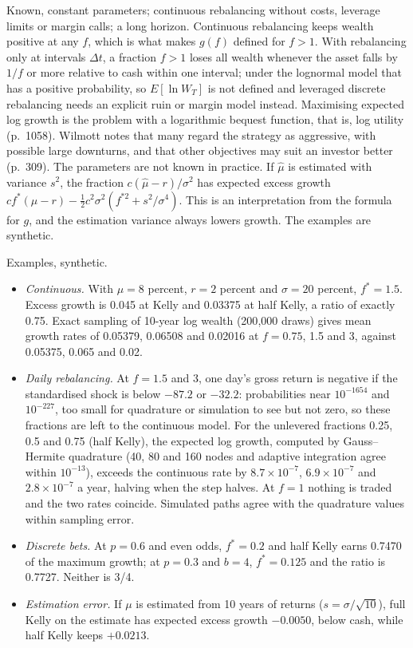\begin{qfresult}
 Known, constant parameters; continuous rebalancing without costs, leverage limits or margin calls; a long horizon. Continuous rebalancing keeps wealth positive at any $f$, which is what makes $g(f)$ defined for $f>1$. With rebalancing only at intervals $\Delta t$, a fraction $f>1$ loses all wealth whenever the asset falls by $1/f$ or more relative to cash within one interval; under the lognormal model that has a positive probability, so $E[\ln W_T]$ is not defined and leveraged discrete rebalancing needs an explicit ruin or margin model instead. Maximising expected log growth is the problem with a logarithmic bequest function, that is, log utility (p.~1058). Wilmott notes that many regard the strategy as aggressive, with possible large downturns, and that other objectives may suit an investor better (p.~309). The parameters are not known in practice. If $\hat\mu$ is estimated with variance $s^2$, the fraction $c(\hat\mu-r)/\sigma^2$ has expected excess growth $cf^*(\mu-r)-\tfrac12c^2\sigma^2(f^{*2}+s^2/\sigma^4)$. This is an interpretation from the formula for $g$, and the estimation variance always lowers growth. The examples are synthetic.

 Examples, synthetic.
\begin{itemize}
\item \emph{Continuous.} With $\mu=8$ percent, $r=2$ percent and $\sigma=20$ percent, $f^*=1.5$. Excess growth is 0.045 at Kelly and 0.03375 at half Kelly, a ratio of exactly 0.75. Exact sampling of 10-year log wealth (200{,}000 draws) gives mean growth rates of 0.05379, 0.06508 and 0.02016 at $f=0.75$, 1.5 and 3, against 0.05375, 0.065 and 0.02.
\item \emph{Daily rebalancing.} At $f=1.5$ and 3, one day's gross return is negative if the standardised shock is below $-87.2$ or $-32.2$: probabilities near $10^{-1654}$ and $10^{-227}$, too small for quadrature or simulation to see but not zero, so these fractions are left to the continuous model. For the unlevered fractions 0.25, 0.5 and 0.75 (half Kelly), the expected log growth, computed by Gauss--Hermite quadrature (40, 80 and 160 nodes and adaptive integration agree within $10^{-13}$), exceeds the continuous rate by $8.7\times10^{-7}$, $6.9\times10^{-7}$ and $2.8\times10^{-7}$ a year, halving when the step halves. At $f=1$ nothing is traded and the two rates coincide. Simulated paths agree with the quadrature values within sampling error.
\item \emph{Discrete bets.} At $p=0.6$ and even odds, $f^*=0.2$ and half Kelly earns 0.7470 of the maximum growth; at $p=0.3$ and $b=4$, $f^*=0.125$ and the ratio is 0.7727. Neither is 3/4.
\item \emph{Estimation error.} If $\mu$ is estimated from 10 years of returns ($s=\sigma/\sqrt{10}$), full Kelly on the estimate has expected excess growth $-0.0050$, below cash, while half Kelly keeps $+0.0213$.
\end{itemize}


\end{qfresult}
